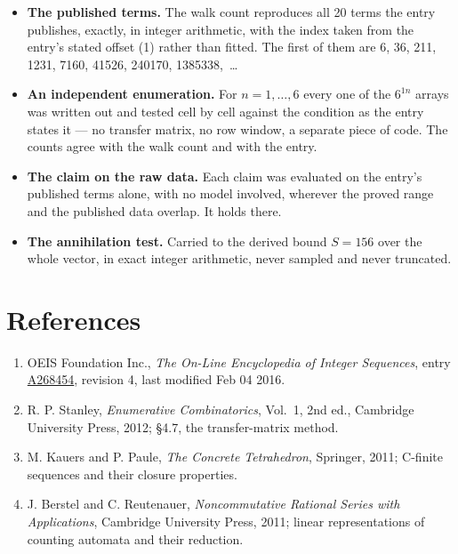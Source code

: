 \documentclass[11pt]{article}
\theoremstyle{definition}
\begin{document}
\begin{itemize}

\item {\bfseries The published terms.} The walk count reproduces all 20 terms the entry publishes, exactly, in integer arithmetic, with the index taken from the entry's stated offset (1) rather than fitted. The first of them are 6, 36, 211, 1231, 7160, 41526, 240170, 1385338,~\dots

\item {\bfseries An independent enumeration.} For $n = 1,\dots,6$ every one of the $6^{1n}$ arrays was written out and tested cell by cell against the condition as the entry states it --- no transfer matrix, no row window, a separate piece of code. The counts agree with the walk count and with the entry.

\item {\bfseries The claim on the raw data.} Each claim was evaluated on the entry's published terms alone, with no model involved, wherever the proved range and the published data overlap. It holds there.

\item {\bfseries The annihilation test.} Carried to the derived bound $S = 156$ over the whole vector, in exact integer arithmetic, never sampled and never truncated.

\end{itemize}

\section{References}

\begin{enumerate}

\item OEIS Foundation Inc., \emph{The On-Line Encyclopedia of Integer Sequences}, entry \href{https://oeis.org/A268454}{A268454}, revision 4, last modified Feb 04 2016.

\item R. P. Stanley, \emph{Enumerative Combinatorics}, Vol.~1, 2nd ed., Cambridge University Press, 2012; \S4.7, the transfer-matrix method.

\item M. Kauers and P. Paule, \emph{The Concrete Tetrahedron}, Springer, 2011; C-finite sequences and their closure properties.

\item J. Berstel and C. Reutenauer, \emph{Noncommutative Rational Series with Applications}, Cambridge University Press, 2011; linear representations of counting automata and their reduction.

\end{enumerate}
\end{document}
